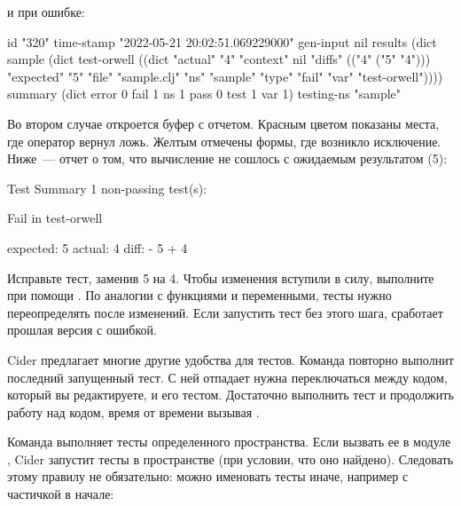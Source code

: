 \noindent
и при ошибке:

\begin{english}
  \begin{text}
  id         "320"
  time-stamp "2022-05-21 20:02:51.069229000"
  gen-input  nil
  results    (dict sample
               (dict test-orwell
                 ((dict "actual" "4"
                        "context" nil
                        "diffs" (("4" ("5" "4")))
                        "expected" "5"
                        "file" "sample.clj"
                        "ns" "sample"
                        "type" "fail"
                        "var" "test-orwell"))))
  summary    (dict error 0 fail 1
                   ns 1 pass 0 test 1 var 1)
  testing-ns "sample"
  \end{text}
\end{english}

Во втором случае откроется буфер  с отчетом. Красным цветом показаны места, где оператор  вернул ложь. Желтым отмечены формы, где возникло исключение. Ниже~--- отчет о том, что вычисление  не сошлось с ожидаемым результатом (5):

\begin{english}
  \begin{text}
Test Summary
1 non-passing test(s):

Fail in test-orwell

expected: 5
  actual: 4
    diff: - 5
          + 4
  \end{text}
\end{english}

Исправьте тест, заменив 5 на 4. Чтобы изменения вступили в силу, выполните  при помощи . По аналогии с функциями и переменными, тесты нужно переопределять после изменений. Если запустить тест без этого шага, сработает прошлая версия с ошибкой.

Cider предлагает многие другие удобства для тестов. Команда  повторно выполнит последний запущенный тест. С ней отпадает нужна переключаться между кодом, который вы редактируете, и его тестом. Достаточно выполнить тест и продолжить работу над кодом, время от времени вызывая .

Команда  выполняет тесты определенного пространства. Если вызвать ее в модуле , Cider запустит тесты в пространстве  (при условии, что оно найдено). Следовать этому правилу не обязательно: можно именовать тесты иначе, например с частичкой  в начале:

